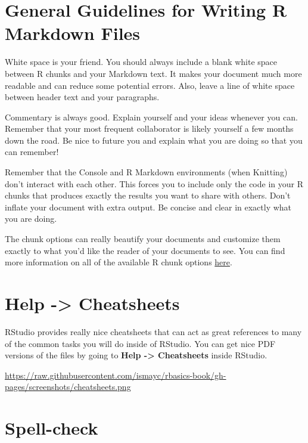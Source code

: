 \documentclass[]{tufte-book}
\begin{document}
\hypertarget{general-guidelines-for-writing-r-markdown-files}{%
\section{General Guidelines for Writing R Markdown Files}\label{general-guidelines-for-writing-r-markdown-files}}

White space is your friend. You should always include a blank white space between R chunks and your Markdown text. It makes your document much more readable and can reduce some potential errors. Also, leave a line of white space between header text and your paragraphs.

Commentary is always good. Explain yourself and your ideas whenever you can. Remember that your most frequent collaborator is likely yourself a few months down the road. Be nice to future you and explain what you are doing so that you can remember!

Remember that the Console and R Markdown environments (when Knitting) don't interact with each other. This forces you to include only the code in your R chunks that produces exactly the results you want to share with others. Don't inflate your document with extra output. Be concise and clear in exactly what you are doing.

The chunk options can really beautify your documents and customize them exactly to what you'd like the reader of your documents to see. You can find more information on all of the available R chunk options \href{http://yihui.name/knitr/options/}{here}.

\hypertarget{help---cheatsheets}{%
\section{Help -\textgreater{} Cheatsheets}\label{help---cheatsheets}}

RStudio provides really nice cheatsheets that can act as great references to many of the common tasks you will do inside of RStudio. You can get nice PDF versions of the files by going to \textbf{Help -\textgreater{} Cheatsheets} inside RStudio.

\vspace{0.1in}\begin{center}\footnotesize{\url{https://raw.githubusercontent.com/ismayc/rbasics-book/gh-pages/screenshots/cheatsheets.png}}\end{center}\vspace{0.1in}

\hypertarget{spell-check}{%
\section{Spell-check}\label{spell-check}}
\end{document}
